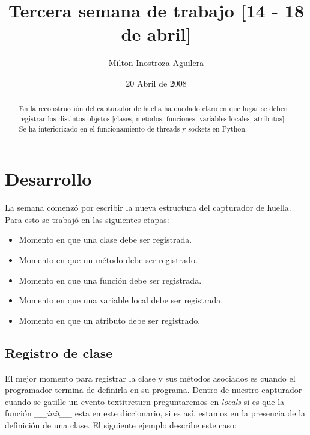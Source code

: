 \documentclass[10pt,a4paper]{article}
\begin{document}
\title{Tercera semana de trabajo [14 - 18 de abril]}
\author{Milton Inostroza Aguilera}
\date{20 Abril de 2008}
\clearpage
\maketitle

\begin{abstract}
En la reconstrucción del capturador de huella ha quedado claro en que lugar se deben registrar los distintos objetos [clases, metodos, funciones, variables locales, atributos].\\

Se ha interiorizado en el funcionamiento de threads y sockets en Python.\\

\end{abstract}
\pagebreak
\section{Desarrollo}
La semana comenzó por escribir la nueva estructura del capturador de huella.  Para esto se trabajó en las siguientes etapas:
\begin{itemize}
\item Momento en que una clase debe ser registrada.
\item Momento en que un método debe ser registrado.
\item Momento en que una función debe ser registrada.
\item Momento en que una variable local debe ser registrada.
\item Momento en que un atributo debe ser registrado.
\end{itemize} 

\subsection{Registro de clase}
El mejor momento para registrar la clase y sus métodos asociados es cuando el programador termina de definirla en su programa.  Dentro de nuestro capturador cuando se gatille un evento textit{return} preguntaremos en \textit{locals} si es que la función \textit{\_\_init\_\_} esta en este diccionario, si es así, estamos en la presencia de la definición de una clase.  El siguiente ejemplo describe este caso:\\
\end{document}
